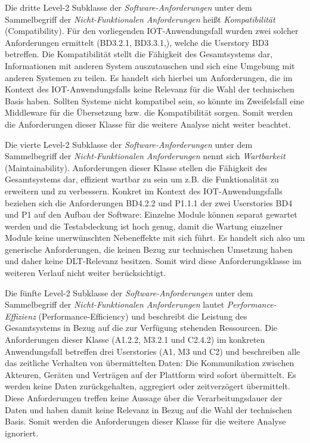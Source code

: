 Die dritte Level-2 Subklasse der \textit{Software-Anforderungen} unter dem Sammelbegriff der \textit{Nicht-Funktionalen Anforderungen} heißt \textit{Kompatibilität} (Compatibility). Für den vorliegenden IOT-Anwendungsfall wurden zwei solcher Anforderungen ermittelt (BD3.2.1, BD3.3.1,), welche die Userstory BD3 betreffen. Die Kompatibilität stellt die Fähigkeit des Gesamtsystems dar, Informationen mit anderen System auszutauschen und sich eine Umgebung mit anderen Systemen zu teilen. Es handelt sich hierbei um Anforderungen, die im Kontext des \ac{IOT}-Anwendungsfalls keine Relevanz für die Wahl der technischen Basis haben. Sollten Systeme nicht kompatibel sein, so könnte im Zweifelsfall eine Middleware für die Übersetzung bzw. die Kompatibilität sorgen. Somit werden die Anforderungen dieser Klasse für die weitere Analyse nicht weiter beachtet.


Die vierte Level-2 Subklasse der \textit{Software-Anforderungen} unter dem Sammelbegriff der \textit{Nicht-Funktionalen Anforderungen} nennt sich \textit{Wartbarkeit} (Maintainability). Anforderungen dieser Klasse stellen die Fähigkeit des Gesamtsystems dar, effizient wartbar zu sein um z.B. die Funktionalität zu erweitern und zu verbessern. Konkret im Kontext des \ac{IOT}-Anwendungsfalls beziehen sich die Anforderungen BD4.2.2 und P1.1.1 der zwei Userstories BD4 und P1 auf den Aufbau der Software: Einzelne Module können separat gewartet werden und die Testabdeckung ist hoch genug, damit die Wartung einzelner Module keine unerwünschten Nebeneffekte mit sich führt. Es handelt sich also um generische Anforderungen, die keinen Bezug zur technischen Umsetzung haben und daher keine \ac{DLT}-Relevanz besitzen. Somit wird diese Anforderungsklasse im weiteren Verlauf nicht weiter berücksichtigt.


Die fünfte Level-2 Subklasse der \textit{Software-Anforderungen} unter dem Sammelbegriff der \textit{Nicht-Funktionalen Anforderungen} lautet \textit{Performance-Effizienz} (Performance-Efficiency) und beschreibt die Leistung des Gesamtsystems in Bezug auf die zur Verfügung stehenden Ressourcen. Die Anforderungen dieser Klasse (A1.2.2, M3.2.1 und C2.4.2) im konkreten Anwendungsfall betreffen drei Userstories (A1, M3 und C2) und beschreiben alle das zeitliche Verhalten von übermittelten Daten: Die Kommunikation zwischen Akteuren, Geräten und Verträgen auf der Plattform wird sofort übermittelt. Es werden keine Daten zurückgehalten, aggregiert oder zeitverzögert übermittelt. Diese Anforderungen treffen keine Aussage über die Verarbeitungsdauer der Daten und haben damit keine Relevanz in Bezug auf die Wahl der technischen Basis. Somit werden die Anforderungen dieser Klasse für die weitere Analyse ignoriert.


